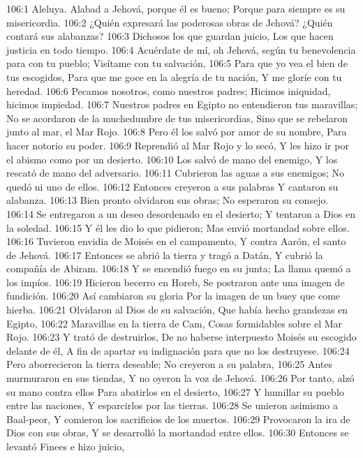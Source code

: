 106:1 Aleluya. 
Alabad a Jehová, porque él es bueno; 
Porque para siempre es su misericordia. 
106:2 ¿Quién expresará las poderosas obras de Jehová? 
¿Quién contará sus alabanzas? 
106:3 Dichosos los que guardan juicio, 
Los que hacen justicia en todo tiempo. 
106:4 Acuérdate de mí, oh Jehová, según tu benevolencia para con tu pueblo; 
Visítame con tu salvación, 
106:5 Para que yo vea el bien de tus escogidos, 
Para que me goce en la alegría de tu nación, 
Y me gloríe con tu heredad. 
106:6 Pecamos nosotros, como nuestros padres; 
Hicimos iniquidad, hicimos impiedad. 
106:7 Nuestros padres en Egipto no entendieron tus maravillas; 
No se acordaron de la muchedumbre de tus misericordias, 
Sino que se rebelaron junto al mar, el Mar Rojo. 
106:8 Pero él los salvó por amor de su nombre, 
Para hacer notorio su poder. 
106:9 Reprendió al Mar Rojo y lo secó, 
Y les hizo ir por el abismo como por un desierto. 
106:10 Los salvó de mano del enemigo, 
Y los rescató de mano del adversario. 
106:11 Cubrieron las aguas a sus enemigos; 
No quedó ni uno de ellos. 
106:12 Entonces creyeron a sus palabras 
Y cantaron su alabanza. 
106:13 Bien pronto olvidaron sus obras; 
No esperaron su consejo. 
106:14 Se entregaron a un deseo desordenado en el desierto; 
Y tentaron a Dios en la soledad. 
106:15 Y él les dio lo que pidieron; 
Mas envió mortandad sobre ellos. 
106:16 Tuvieron envidia de Moisés en el campamento, 
Y contra Aarón, el santo de Jehová. 
106:17 Entonces se abrió la tierra y tragó a Datán, 
Y cubrió la compañía de Abiram. 
106:18 Y se encendió fuego en su junta; 
La llama quemó a los impíos. 
106:19 Hicieron becerro en Horeb, 
Se postraron ante una imagen de fundición. 
106:20 Así cambiaron su gloria 
Por la imagen de un buey que come hierba. 
106:21 Olvidaron al Dios de su salvación, 
Que había hecho grandezas en Egipto, 
106:22 Maravillas en la tierra de Cam, 
Cosas formidables sobre el Mar Rojo. 
106:23 Y trató de destruirlos, 
De no haberse interpuesto Moisés su escogido delante de él, 
A fin de apartar su indignación para que no los destruyese. 
106:24 Pero aborrecieron la tierra deseable; 
No creyeron a su palabra, 
106:25 Antes murmuraron en sus tiendas, 
Y no oyeron la voz de Jehová. 
106:26 Por tanto, alzó su mano contra ellos 
Para abatirlos en el desierto, 
106:27 Y humillar su pueblo entre las naciones, 
Y esparcirlos por las tierras. 
106:28 Se unieron asimismo a Baal-peor, 
Y comieron los sacrificios de los muertos. 
106:29 Provocaron la ira de Dios con sus obras, 
Y se desarrolló la mortandad entre ellos. 
106:30 Entonces se levantó Finees e hizo juicio, 
